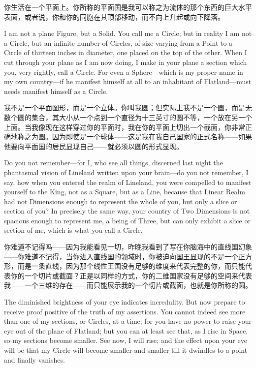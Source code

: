 \documentclass[12pt,UTF8]{ctexbook}
\begin{document}
你生活在一个平面上。你所称的平面国是我可以称之为流体的那个东西的巨大水平表面，或者说，你和你的同胞在其顶部移动，而不向上升起或向下降落。

I am not a plane Figure, but a Solid. You call me a Circle; but in reality I am not a Circle, but an infinite number of Circles, of size varying from a Point to a Circle of thirteen inches in diameter, one placed on the top of the other. When I cut through your plane as I am now doing, I make in your plane a section which you, very rightly, call a Circle. For even a Sphere---which is my proper name in my own country---if he manifest himself at all to an inhabitant of Flatland---must needs manifest himself as a Circle.

我不是一个平面图形，而是一个立体。你叫我圆；但实际上我不是一个圆，而是无数个圆的集合，其大小从一个点到一个直径为十三英寸的圆不等，一个放在另一个上面。当我像现在这样穿过你的平面时，我在你的平面上切出一个截面，你非常正确地称之为圆。因为即使是一个球体——这是我在我自己国家的正式名称——如果他要向平面国的居民显现自己——就必须以圆的形式显现。

Do you not remember---for I, who see all things, discerned last night the phantasmal vision of Lineland written upon your brain---do you not remember, I say, how when you entered the realm of Lineland, you were compelled to manifest yourself to the King, not as a Square, but as a Line, because that Linear Realm had not Dimensions enough to represent the whole of you, but only a slice or section of you? In precisely the same way, your country of Two Dimensions is not spacious enough to represent me, a being of Three, but can only exhibit a slice or section of me, which is what you call a Circle.

你难道不记得吗——因为我能看见一切，昨晚我看到了写在你脑海中的直线国幻象——你难道不记得，当你进入直线国的领域时，你被迫向国王显现的不是一个正方形，而是一条直线，因为那个线性王国没有足够的维度来代表完整的你，而只能代表你的一个切片或截面？正是以同样的方式，你的二维国家没有足够的空间来代表我——一个三维的存在——而只能展示我的一个切片或截面，也就是你所称的圆。

The diminished brightness of your eye indicates incredulity. But now prepare to receive proof positive of the truth of my assertions. You cannot indeed see more than one of my sections, or Circles, at a time; for you have no power to raise your eye out of the plane of Flatland; but you can at least see that, as I rise in Space, so my sections become smaller. See now, I will rise; and the effect upon your eye will be that my Circle will become smaller and smaller till it dwindles to a point and finally vanishes.
\end{document}
